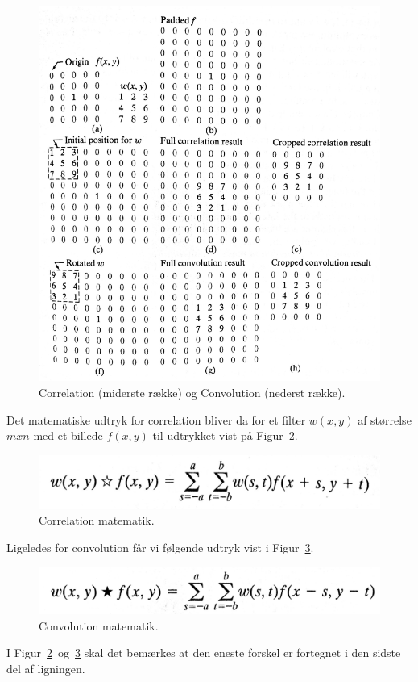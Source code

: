\begin{figure}[H]
	\centering
	\includegraphics[width=0.8\linewidth]{figs/spm02/corr-v-con}
	\caption{Correlation (miderste række) og Convolution (nederst række).}
	\label{fig:corr-v-con}
\end{figure}

Det matematiske udtryk for correlation bliver da for et filter $w(x,y)$ af størrelse $m x n$ med et billede $f(x,y)$ til udtrykket vist på Figur~\ref{fig:correlation-eq}.

\begin{figure}[H]
	\centering
	\includegraphics[width=0.6\linewidth]{figs/spm02/correlation-eq}
	\caption{Correlation matematik.}
	\label{fig:correlation-eq}
\end{figure}

Ligeledes for convolution får vi følgende udtryk vist i Figur~\ref{fig:convolution-eq}.

\begin{figure}[H]
	\centering
	\includegraphics[width=0.6\linewidth]{figs/spm02/convolution-eq}
	\caption{Convolution matematik.}
	\label{fig:convolution-eq}
\end{figure}

I Figur~\ref{fig:correlation-eq}~og~\ref{fig:convolution-eq} skal det bemærkes at den eneste forskel er fortegnet i den sidste del af ligningen.
